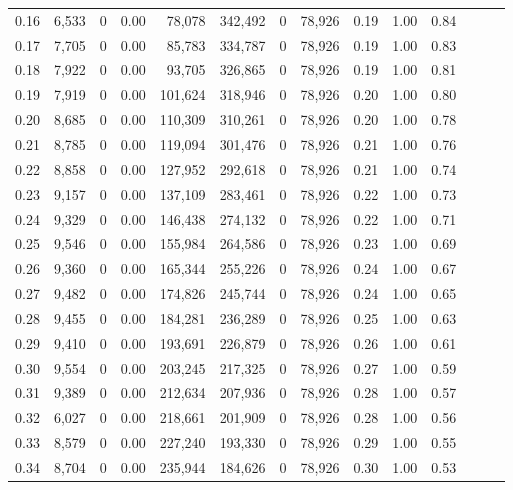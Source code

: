 \begin{tabular}{rrrrrrrrrrrrrr}
0.16 &  6,533 &      0 &  0.00 &   78,078 &  342,492 &       0 &  78,926 &  0.19 &  1.00 &      0.84 \\
0.17 &  7,705 &      0 &  0.00 &   85,783 &  334,787 &       0 &  78,926 &  0.19 &  1.00 &      0.83 \\
0.18 &  7,922 &      0 &  0.00 &   93,705 &  326,865 &       0 &  78,926 &  0.19 &  1.00 &      0.81 \\
0.19 &  7,919 &      0 &  0.00 &  101,624 &  318,946 &       0 &  78,926 &  0.20 &  1.00 &      0.80 \\
0.20 &  8,685 &      0 &  0.00 &  110,309 &  310,261 &       0 &  78,926 &  0.20 &  1.00 &      0.78 \\
0.21 &  8,785 &      0 &  0.00 &  119,094 &  301,476 &       0 &  78,926 &  0.21 &  1.00 &      0.76 \\
0.22 &  8,858 &      0 &  0.00 &  127,952 &  292,618 &       0 &  78,926 &  0.21 &  1.00 &      0.74 \\
0.23 &  9,157 &      0 &  0.00 &  137,109 &  283,461 &       0 &  78,926 &  0.22 &  1.00 &      0.73 \\
0.24 &  9,329 &      0 &  0.00 &  146,438 &  274,132 &       0 &  78,926 &  0.22 &  1.00 &      0.71 \\
0.25 &  9,546 &      0 &  0.00 &  155,984 &  264,586 &       0 &  78,926 &  0.23 &  1.00 &      0.69 \\
0.26 &  9,360 &      0 &  0.00 &  165,344 &  255,226 &       0 &  78,926 &  0.24 &  1.00 &      0.67 \\
0.27 &  9,482 &      0 &  0.00 &  174,826 &  245,744 &       0 &  78,926 &  0.24 &  1.00 &      0.65 \\
0.28 &  9,455 &      0 &  0.00 &  184,281 &  236,289 &       0 &  78,926 &  0.25 &  1.00 &      0.63 \\
0.29 &  9,410 &      0 &  0.00 &  193,691 &  226,879 &       0 &  78,926 &  0.26 &  1.00 &      0.61 \\
0.30 &  9,554 &      0 &  0.00 &  203,245 &  217,325 &       0 &  78,926 &  0.27 &  1.00 &      0.59 \\
0.31 &  9,389 &      0 &  0.00 &  212,634 &  207,936 &       0 &  78,926 &  0.28 &  1.00 &      0.57 \\
0.32 &  6,027 &      0 &  0.00 &  218,661 &  201,909 &       0 &  78,926 &  0.28 &  1.00 &      0.56 \\
0.33 &  8,579 &      0 &  0.00 &  227,240 &  193,330 &       0 &  78,926 &  0.29 &  1.00 &      0.55 \\
0.34 &  8,704 &      0 &  0.00 &  235,944 &  184,626 &       0 &  78,926 &  0.30 &  1.00 &      0.53 \\

\end{tabular}
